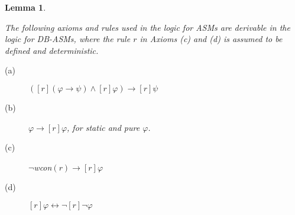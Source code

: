 \documentclass[preprint,11pt]{elsarticle}
\newtheorem{lemma}[theorem]{Lemma}
\theoremstyle{definition}
\theoremstyle{remark}
\begin{document}
\begin{lemma}\label{lem-modalAxiomsASMs}

The following axioms and rules used in the logic for ASMs are derivable in the logic for DB-ASMs, where the rule $r$ in Axioms (c) and (d) is assumed to be defined and deterministic.

\begin{description}

  \item[(a)] $([r](\varphi\rightarrow\psi)\wedge [r]\varphi)\rightarrow[r]\psi$\smallskip

  \item[(b)] $\varphi\rightarrow[r]\varphi$, for static and pure $\varphi$. \smallskip

  \item[(c)] $\neg$wcon$(r)\rightarrow [r]\varphi$\smallskip

  \item[(d)] $[r]\varphi\leftrightarrow \neg[r]\neg\varphi$\smallskip

\end{description}
\end{lemma}
\end{document}
